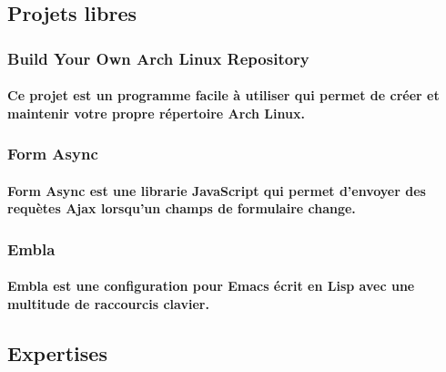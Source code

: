 \documentclass{resume}
\begin{document}
	\vspace{2.5mm}

	\begin{multicols}{2}
		\subsection*{Projets libres}
			\subsubsection*{Build Your Own Arch Linux Repository}
			\paragraph{Ce projet est un programme facile à utiliser qui permet de créer et maintenir votre propre répertoire Arch Linux.}
			\vspace{1mm}

			\subsubsection*{Form Async}
			\paragraph{Form Async est une librarie JavaScript qui permet d'envoyer des requètes Ajax lorsqu'un champs de formulaire change.}
			\vspace{1mm}

			\subsubsection*{Embla}
			\paragraph{Embla est une configuration pour Emacs écrit en Lisp avec une multitude de raccourcis clavier.}
			\vspace{1mm}

		\columnbreak

		\subsection*{Expertises}


\end{multicols}
\end{document}

